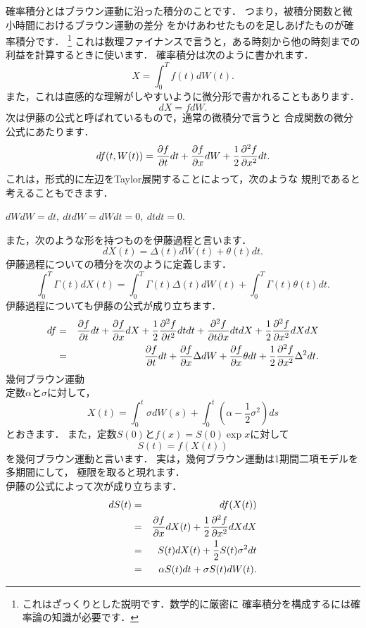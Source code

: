 確率積分とはブラウン運動に沿った積分のことです．
つまり，被積分関数と微小時間におけるブラウン運動の差分
をかけあわせたものを足しあげたものが確率積分です．
\footnote{これはざっくりとした説明です．数学的に厳密に
確率積分を構成するには確率論の知識が必要です．}
これは数理ファイナンスで言うと，ある時刻から他の時刻までの
利益を計算するときに使います．
確率積分は次のように書かれます．
\begin{equation*}
 X=\int_{0}^{T}f(t)dW(t).
\end{equation*}
また，これは直感的な理解がしやすいように微分形で書かれることもあります．
\begin{equation*}
 dX=fdW.
\end{equation*}
次は伊藤の公式と呼ばれているもので，通常の微積分で言うと
合成関数の微分公式にあたります．
\[
 df(t,W(t))=\frac{\partial f}{\partial t}dt+\frac{\partial f}{\partial x}dW+
 \frac{1}{2}\frac{\partial^2f}{\partial x^2}dt.
\]
これは，形式的に左辺をTaylor展開することによって，次のような
規則であると考えることもできます．
\begin{screen}
\begin{center}
 $dWdW=dt,\ dtdW=dWdt=0,\ dtdt=0.$
\end{center}
\end{screen}
また，次のような形を持つものを伊藤過程と言います．
\[
 dX(t)=\Delta (t)dW(t)+\theta (t)dt.
\]
伊藤過程についての積分を次のように定義します．
\[
 \int_{0}^{T}\Gamma (t)dX(t)=\int_{0}^{T}\Gamma(t)\Delta(t)dW(t)
 +\int_{0}^{T}\Gamma(t)\theta(t)dt.
\]
伊藤過程についても伊藤の公式が成り立ちます．
\begin{eqnarray*}
 df& = &\frac{\partial f}{\partial t}dt+\frac{\partial f}{\partial x}dX
 +\frac{1}{2}\frac{\partial^2f}{\partial t^2}dtdt+\frac{\partial^2f}{\partial t\partial x}dtdX
 +\frac{1}{2}\frac{\partial^2f}{\partial x^2}dXdX\\
 & = &\frac{\partial f}{\partial t}dt+\frac{\partial f}{\partial x}\Delta dW 
 +\frac{\partial f}{\partial x}\theta dt+
 \frac{1}{2}\frac{\partial^2 f}{\partial x^2}\Delta^2dt.\\ 
\end{eqnarray*}
\kikueg 幾何ブラウン運動
\\
定数$\alpha$と$\sigma$に対して，
\[
 X(t)=\int_{0}^{t}\sigma dW(s)+
 \int_{0}^{t}\left(\alpha-\frac{1}{2}\sigma^2\right)ds
\]
とおきます．
また，定数$S(0)$と$f(x)=S(0)\exp x$に対して
\[
 S(t)=f(X(t))
\]
を幾何ブラウン運動と言います．
実は，幾何ブラウン運動は1期間二項モデルを多期間にして，
極限を取ると現れます．
\\
伊藤の公式によって次が成り立ちます．
\begin{eqnarray*}
 dS(t)& = &df(X(t))\\
 & = &\frac{\partial f}{\partial x}dX(t)+\frac{1}{2}\frac{\partial^2f}{\partial x^2}dXdX \\
 & = &S(t)dX(t)+\frac{1}{2}S(t)\sigma^2dt \\
 & = &\alpha S(t)dt+\sigma S(t)dW(t).
\end{eqnarray*}
